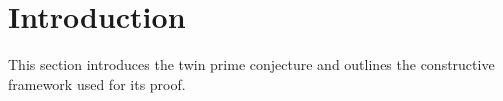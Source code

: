 \section*{Introduction}
This section introduces the twin prime conjecture and outlines the constructive framework used for its proof.